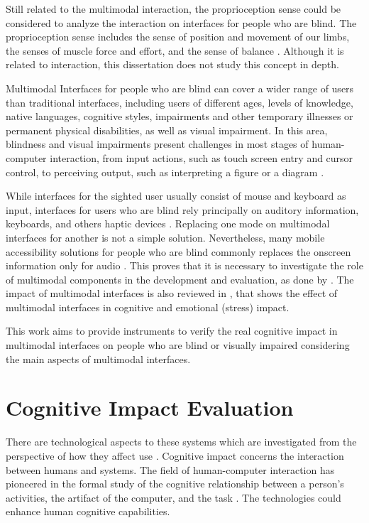 Still related to the multimodal interaction, the proprioception sense could be considered to analyze the interaction on interfaces for people who are blind. The proprioception sense includes the sense of position and movement of our limbs, the senses of muscle force and effort, and the sense of balance \cite{proprioception}. Although it is related to interaction, this dissertation does not study this concept in depth.

Multimodal Interfaces for people who are blind can cover a wider range of users than traditional interfaces, including users of different ages, levels of knowledge, native languages, cognitive styles, impairments and other temporary illnesses or permanent physical disabilities, as well as visual impairment. In this area, blindness and visual impairments present challenges in most stages of human-computer interaction, from input actions, such as touch screen entry and cursor control, to perceiving output, such as interpreting a figure or a diagram \cite{Keates2015}.

While interfaces for the sighted user usually consist of mouse and keyboard as input, interfaces for users who are blind rely principally on auditory information, keyboards, and others haptic devices \cite{Sanchez2014a}. Replacing one mode on multimodal interfaces for another is not a simple solution. Nevertheless, many mobile accessibility solutions for people who are blind commonly replaces the onscreen information only for audio \cite{Guerreiro2011}. This proves that it is necessary to investigate the role of multimodal components in the development and evaluation, as done by \cite{Sanchez2015}. The impact of multimodal interfaces is also reviewed in \cite{Cao2010}, that shows the effect of multimodal interfaces in cognitive and emotional (stress) impact. 

This work aims to provide instruments to verify the real cognitive impact in multimodal interfaces on people who are blind or visually impaired considering the main aspects of multimodal interfaces.

\section{Cognitive Impact Evaluation}
\label{sec:background-cognitive-impact-evaluation}
There are technological aspects to these systems which are investigated from the perspective of how they affect use \cite{Ritter2014}. Cognitive impact concerns the interaction between humans and systems. The field of human-computer interaction has pioneered in the formal study of the cognitive relationship between a person's activities, the artifact of the computer, and the task \cite{Norman1986}. The technologies could enhance human cognitive capabilities. 

